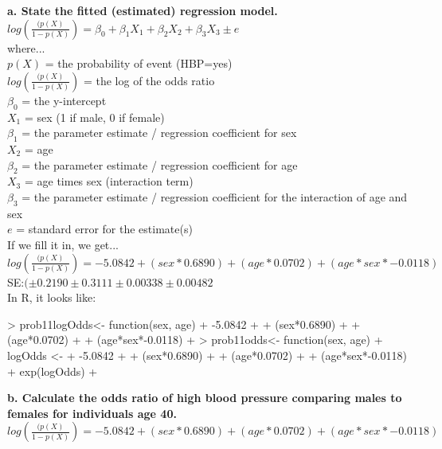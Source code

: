 \documentclass{article}
\begin{document}
\noindent \textbf{a. State the fitted (estimated) regression model.} \\
\noindent $ log(\frac{(p(X)}{1-p(X)}) = \beta_0+\beta_1 X_1 +\beta_2 X_2 +\beta_3 X_3\pm e $ \\

where...\\

\noindent $ p(X)$ = the probability of event (HBP=yes) \\
$ log(\frac{(p(X)}{1-p(X)})$ = the log of the odds ratio \\
$ \beta_0 $ = the y-intercept \\
$ X_1$ = sex (1 if male, 0 if female)\\
$ \beta_1$ = the parameter estimate / regression coefficient for sex\\
$ X_2$ = age\\
$ \beta_2$ = the parameter estimate / regression coefficient for age\\
$ X_3$ = age times sex (interaction term) \\
$ \beta_3$ = the parameter estimate / regression coefficient for the interaction of age and sex\\
$ e $ = standard error for the estimate(s)\\

If we fill it in, we get... \\

\noindent $ log(\frac{(p(X)}{1-p(X)}) = -5.0842 + (sex*0.6890) + (age*0.0702) + (age*sex*-0.0118)$\\

\noindent \pm SE:$ (\pm 0.2190 \pm 0.3111 \pm 0.00338 \pm 0.00482 $ \\

In R, it looks like:
\begin{Schunk}
\begin{Sinput}
> prob11logOdds<- function(sex, age){
+     -5.0842 + 
+     (sex*0.6890) +
+     (age*0.0702) +
+     (age*sex*-0.0118)
+ }
> prob11odds<- function(sex, age){
+   logOdds <- 
+     -5.0842 + 
+     (sex*0.6890) +
+     (age*0.0702) +
+     (age*sex*-0.0118)
+   exp(logOdds)
+ }
\end{Sinput}
\end{Schunk}


\newpage
\noindent \textbf{b. Calculate the odds ratio of high blood pressure comparing males to females for individuals age 40.} \\

\noindent $ log(\frac{(p(X)}{1-p(X)}) = -5.0842 + (sex*0.6890) + (age*0.0702) + (age*sex*-0.0118)$\\
\end{document}
